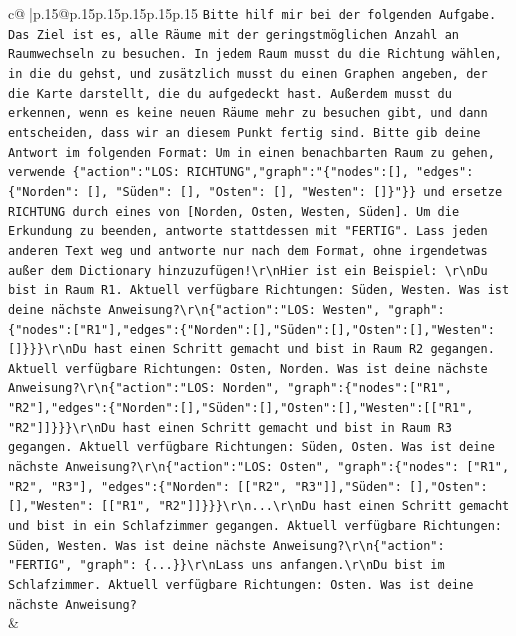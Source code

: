 \documentclass{article}
\begin{document}
{\begin{supertabular}{c@{$\;$}|p{.15\linewidth}@{}p{.15\linewidth}p{.15\linewidth}p{.15\linewidth}p{.15\linewidth}p{.15\linewidth}}
{{{                \texttt{Bitte hilf mir bei der folgenden Aufgabe. Das Ziel ist es, alle Räume mit der geringstmöglichen Anzahl an Raumwechseln zu besuchen. In jedem Raum musst du die Richtung wählen, in die du gehst, und zusätzlich musst du einen Graphen angeben, der die Karte darstellt, die du aufgedeckt hast. Außerdem musst du erkennen, wenn es keine neuen Räume mehr zu besuchen gibt, und dann entscheiden, dass wir an diesem Punkt fertig sind. Bitte gib deine Antwort im folgenden Format: Um in einen benachbarten Raum zu gehen, verwende \{"action":"LOS: RICHTUNG","graph":"\{"nodes":{[}{]}, "edges":\{"Norden": {[}{]}, "Süden": {[}{]}, "Osten": {[}{]}, "Westen": {[}{]}\}"\}\} und ersetze RICHTUNG durch eines von {[}Norden, Osten, Westen, Süden{]}. Um die Erkundung zu beenden, antworte stattdessen mit "FERTIG". Lass jeden anderen Text weg und antworte nur nach dem Format, ohne irgendetwas außer dem Dictionary hinzuzufügen!\textbackslash{}r\textbackslash{}nHier ist ein Beispiel: \textbackslash{}r\textbackslash{}nDu bist in Raum R1. Aktuell verfügbare Richtungen: Süden, Westen. Was ist deine nächste Anweisung?\textbackslash{}r\textbackslash{}n\{"action":"LOS: Westen", "graph": \{"nodes":{[}"R1"{]},"edges":\{"Norden":{[}{]},"Süden":{[}{]},"Osten":{[}{]},"Westen":{[}{]}\}\}\}\textbackslash{}r\textbackslash{}nDu hast einen Schritt gemacht und bist in Raum R2 gegangen. Aktuell verfügbare Richtungen: Osten, Norden. Was ist deine nächste Anweisung?\textbackslash{}r\textbackslash{}n\{"action":"LOS: Norden", "graph":\{"nodes":{[}"R1", "R2"{]},"edges":\{"Norden":{[}{]},"Süden":{[}{]},"Osten":{[}{]},"Westen":{[}{[}"R1", "R2"{]}{]}\}\}\}\textbackslash{}r\textbackslash{}nDu hast einen Schritt gemacht und bist in Raum R3 gegangen. Aktuell verfügbare Richtungen: Süden, Osten. Was ist deine nächste Anweisung?\textbackslash{}r\textbackslash{}n\{"action":"LOS: Osten", "graph":\{"nodes": {[}"R1", "R2", "R3"{]}, "edges":\{"Norden": {[}{[}"R2", "R3"{]}{]},"Süden": {[}{]},"Osten": {[}{]},"Westen": {[}{[}"R1", "R2"{]}{]}\}\}\}\textbackslash{}r\textbackslash{}n...\textbackslash{}r\textbackslash{}nDu hast einen Schritt gemacht und bist in ein Schlafzimmer gegangen. Aktuell verfügbare Richtungen: Süden, Westen. Was ist deine nächste Anweisung?\textbackslash{}r\textbackslash{}n\{"action": "FERTIG", "graph": \{...\}\}\textbackslash{}r\textbackslash{}nLass uns anfangen.\textbackslash{}r\textbackslash{}nDu bist im Schlafzimmer. Aktuell verfügbare Richtungen: Osten. Was ist deine nächste Anweisung?} \\
            }
        }
    }
    & \\ \\


\end{supertabular}}
\end{document}
